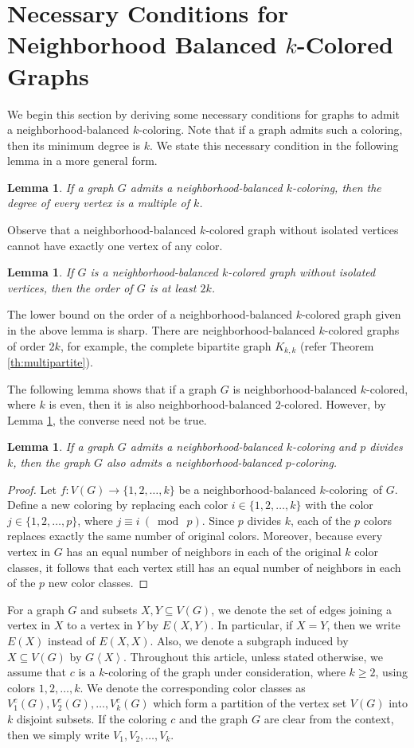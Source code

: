 \documentclass[12pt]{article}
\newtheorem{lemma}[theorem]{Lemma}
\newcommand{\nbc}{neighborhood-balanced $k$-coloring\xspace}
\newcommand{\nbcd}{neighborhood-balanced $k$-colored\xspace}
\begin{document}
\section{Necessary Conditions for Neighborhood Balanced $k$-Colored Graphs} \label{sec:NC}
We begin this section by deriving some necessary conditions for graphs to admit a \nbc.
Note that if a graph admits such a coloring, then its minimum degree is $k$.
We state this necessary condition in the following lemma in a more general form.

\begin{lemma}\label{th:prep1}
If a graph $G$ admits a \nbc, then the degree of every vertex is a multiple of $k$. 
\end{lemma}

Observe that a \nbcd graph without isolated vertices cannot have exactly one vertex of any color.

\begin{lemma} \label{th:order of nbc graph}
    If $G$ is a \nbcd graph without isolated vertices, then the order of $G$ is at least $2k$.
\end{lemma}
The lower bound on the order of a \nbcd graph given in the above lemma is sharp.
There are \nbcd graphs of order $2k$, for example, the complete bipartite graph $K_{k,k}$ (refer Theorem \ref{th:multipartite}). 


The following lemma shows that if a graph $G$ is \nbcd, where $k$ is even, then it is also neighborhood-balanced $2$-colored.
However, by Lemma \ref{th:prep1}, the converse need not be true.

\begin{lemma}
If a graph $G$ admits a \nbc and $p$ divides $k$, then the graph $G$ also admits a neighborhood-balanced $p$-coloring.
\end{lemma}
\begin{proof}
   Let \( f \colon V(G) \to \{1, 2, \dots, k\} \) be a \nbc\ of \(G\). Define a new coloring by replacing each color \( i \in \{1, 2, \dots, k\} \) with the color \( j \in \{1, 2, \dots, p\} \), where \(j \equiv i\ (\bmod\ p )\). Since \( p \) divides \( k \), each of the \( p \) colors replaces exactly the same number of original colors. Moreover, because every vertex in \(G\) has an equal number of neighbors in each of the original \( k \) color classes, it follows that each vertex still has an equal number of neighbors in each of the \( p \) new color classes.
\end{proof}

For a graph $G$ and subsets $X , Y \subseteq V(G)$, we denote the set of edges joining a vertex in $X$ to a vertex in $Y$ by $E(X,Y)$.
In particular, if $X = Y$, then we write $E(X)$ instead of $E(X,X)$.
Also, we denote a subgraph induced by $X \subseteq V(G)$ by $G\left<X\right>$.
Throughout this article, unless stated otherwise, we assume that $c$ is a $k$-coloring of the graph under consideration, where $k \ge 2$, using colors $1, 2,\dots, k$.
We denote the corresponding color classes as $V_1^{c}(G), V_2^{c}(G),\dots, V_k^{c}(G)$  which form a partition of the vertex set $V(G)$ into $k$ disjoint subsets. If the coloring $c$ and the graph $G$ are clear from the context, then we simply write $V_1, V_2,\dots, V_k$.
\end{document}

